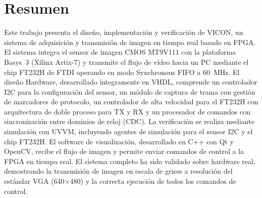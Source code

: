 

\begingroup
\let\clearpage\relax
\let\cleardoublepage\relax
\let\cleardoublepage\relax




\chapter*{Resumen} %

Este trabajo presenta el diseño, implementación y verificación de \ac{VICON}, un sistema de adquisición y transmisión de imagen en tiempo 
real basado en \ac{FPGA}. El sistema integra el sensor de imagen CMOS MT9V111 con la plataforma Basys~3 (Xilinx Artix-7) y transmite el flujo de vídeo hacia un PC mediante 
el chip FT232H de FTDI operando en modo Synchronous FIFO a 60~MHz.
El diseño Hardware, desarrollado íntegramente en \ac{VHDL}, comprende un controlador I2C para la configuración del sensor, un módulo de captura de trama con gestión 
de marcadores de protocolo, un controlador de alta velocidad para el FT232H con arquitectura de doble proceso para TX y RX y un procesador de comandos con 
sincronización entre dominios de reloj (\ac{CDC}). La verificación se realiza mediante simulación con \ac{UVVM}, 
incluyendo agentes de simulación para el sensor I2C y el chip FT232H. El software de visualización, desarrollado en C++ con Qt y OpenCV, recibe el flujo de imagen y permite enviar comandos de control a la \ac{FPGA} en tiempo real.
El sistema completo ha sido validado sobre hardware real, demostrando la transmisión de imagen en escala de grises a resolución del estándar \ac{VGA} (640$\times$480) y la correcta ejecución de todos los comandos de control.
\endgroup
\providecommand{\keywords}[1]
{
	\small	
	\textbf{\textit{Keywords---}} #1
}			

\vfill